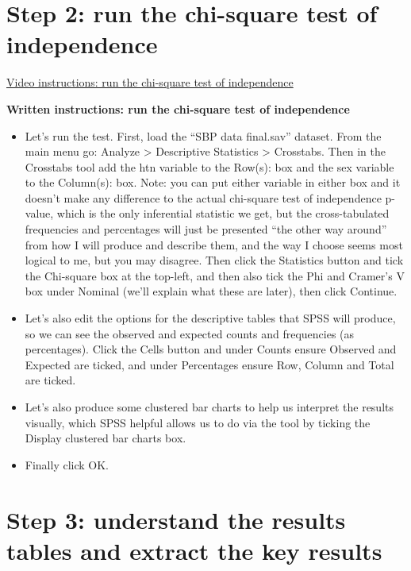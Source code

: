 \documentclass[
]{book}
\begin{document}
\hypertarget{step-2-run-the-chi-square-test-of-independence}{%
\section{Step 2: run the chi-square test of independence}\label{step-2-run-the-chi-square-test-of-independence}}

\href{https://youtu.be/MNFDgkKFY3c}{Video instructions: run the chi-square test of independence}

\textbf{Written instructions: run the chi-square test of independence}

\begin{itemize}
\item
  Let's run the test. First, load the ``SBP data final.sav'' dataset. From the main menu go: Analyze \textgreater{} Descriptive Statistics \textgreater{} Crosstabs. Then in the Crosstabs tool add the htn variable to the Row(s): box and the sex variable to the Column(s): box. Note: you can put either variable in either box and it doesn't make any difference to the actual chi-square test of independence p-value, which is the only inferential statistic we get, but the cross-tabulated frequencies and percentages will just be presented ``the other way around'' from how I will produce and describe them, and the way I choose seems most logical to me, but you may disagree. Then click the Statistics button and tick the Chi-square box at the top-left, and then also tick the Phi and Cramer's V box under Nominal (we'll explain what these are later), then click Continue.
\item
  Let's also edit the options for the descriptive tables that SPSS will produce, so we can see the observed and expected counts and frequencies (as percentages). Click the Cells button and under Counts ensure Observed and Expected are ticked, and under Percentages ensure Row, Column and Total are ticked.
\item
  Let's also produce some clustered bar charts to help us interpret the results visually, which SPSS helpful allows us to do via the tool by ticking the Display clustered bar charts box.
\item
  Finally click OK.
\end{itemize}

\hypertarget{step-3-understand-the-results-tables-and-extract-the-key-results-1}{%
\section{Step 3: understand the results tables and extract the key results}\label{step-3-understand-the-results-tables-and-extract-the-key-results-1}}
\end{document}
